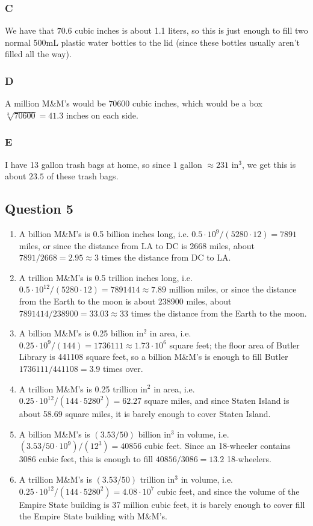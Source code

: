 \documentclass[12pt,letterpaper]{article}
\theoremstyle{definition}
\begin{document}
\subsubsection*{C}
We have that $70.6$ cubic inches is about 1.1 liters, so this is just enough to fill two normal 500mL plastic water bottles to the lid (since these bottles usually aren't filled all the way).
\subsubsection*{D}
A million M\&M's would be $70600$ cubic inches, which would be a box $\sqrt[3]{70600} = 41.3$ inches on each side.
\subsubsection*{E}
I have 13 gallon trash bags at home, so since $1$ gallon $\approx 231$ in$^{3}$, we get this is about $23.5$ of these trash bags.

\subsection*{Question 5}
\begin{enumerate}
  \item A billion M\&M's is 0.5 billion inches long, i.e. $0.5 \cdot 10^{9} / (5280 \cdot 12) = 7891$ miles, or since the distance from LA to DC is 2668 miles, about $7891 / 2668 = 2.95 \approx 3$ times the distance from DC to LA.
  \item A trillion M\&M's is 0.5 trillion inches long, i.e. $0.5 \cdot 10^{12} / (5280 \cdot 12) = 7891414 \approx 7.89$ million miles, or since the distance from the Earth to the moon is about 238900 miles, about $7891414 / 238900 = 33.03 \approx 33$ times the distance from the Earth to the moon.
  \item A billion M\&M's is 0.25 billion in$^{2}$ in area, i.e. $0.25 \cdot 10^{9} / (144) = 1736111 \approx 1.73 \cdot 10^{6}$ square feet; the floor area of Butler Library is 441108 square feet, so a billion M\&M's is enough to fill Butler $1736111/441108 = 3.9$ times over.
  \item A trillion M\&M's is 0.25 trillion in$^{2}$ in area, i.e. $0.25 \cdot 10^{12} / (144 \cdot 5280^{2}) = 62.27$ square miles, and since Staten Island is about 58.69 square miles, it is barely enough to cover Staten Island.
  \item A billion M\&M's is $(3.53 / 50)$ billion in$^{3}$ in volume, i.e. $(3.53 / 50 \cdot 10^{9}) / (12^{3}) = 40856$ cubic feet. Since an 18-wheeler contains 3086 cubic feet, this is enough to fill $40856  / 3086 = 13.2$ 18-wheelers.
  \item A trillion M\&M's is $(3.53 / 50)$ trillion in$^{3}$ in volume, i.e. $0.25 \cdot 10^{12} / (144 \cdot 5280^{2}) = 4.08 \cdot 10^{7}$ cubic feet, and since the volume of the Empire State building is 37 million cubic feet, it is barely enough to cover fill the Empire State building with M\&M's.
\end{enumerate}
\end{document}
